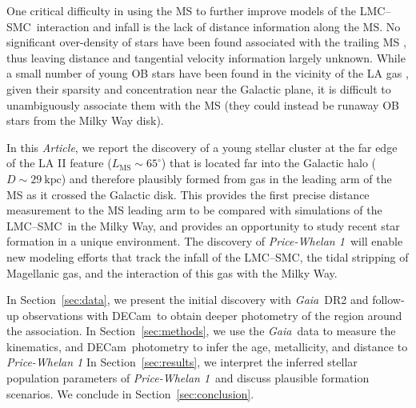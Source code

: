 \documentclass[twocolumn]{aastex62}
\newcommand{\acronym}[1]{{\small{#1}}}
\newcommand{\gaia}{\textsl{Gaia}}
\newcommand{\decam}{DECam}
\newcommand{\DR}[1]{\acronym{DR#1}}
\newcommand{\articlename}{\textsl{Article}}
\newcommand{\sectionname}{Section}
\newcommand{\clustername}{\textsl{Price-Whelan 1}}
\newcommand{\lmcsmc}{LMC--SMC}
\newcommand{\cldist}{\ensuremath{29~\textrm{kpc}}}
\begin{document}
One critical difficulty in using the MS to further improve models of the \lmcsmc\ interaction and infall is the lack of distance information along the MS.
No significant over-density of stars have been found associated with the trailing MS \citep{Guhathakurta:1998}, thus leaving distance and tangential velocity information largely unknown.
While a small number of young OB stars have been found in the vicinity of the LA gas \citep{Casetti-Dinescu:2014, Zhang:2017}, given their sparsity and concentration near the Galactic plane, it is difficult to unambiguously associate them with the MS (they could instead be runaway OB stars from the Milky Way disk).

In this \articlename, we report the discovery of a young stellar cluster at the far edge of the LA II feature ($L_{\textrm{MS}} \sim 65^\circ$) that is located far into the Galactic halo ($D \sim \cldist$) and therefore plausibly formed from gas in the leading arm of the MS as it crossed the Galactic disk.
This provides the first precise distance measurement to the MS leading arm to be compared with simulations of the \lmcsmc\ in the Milky Way, and provides an opportunity to study recent star formation in a unique environment.
The discovery of \clustername\ will enable new modeling efforts that track the infall of the \lmcsmc, the tidal stripping of Magellanic gas, and the interaction of this gas with the Milky Way.

In \sectionname~\ref{sec:data}, we present the initial discovery with \gaia\ \DR{2} and follow-up observations with \decam\ to obtain deeper photometry of the region around the association.
In \sectionname~\ref{sec:methods}, we use the \gaia\ data to measure the kinematics, and \decam\ photometry to infer the age, metallicity, and distance to \clustername
In \sectionname~\ref{sec:results}, we interpret the inferred stellar population parameters of \clustername\ and discuss plausible formation scenarios.
We conclude in \sectionname~\ref{sec:conclusion}.
\end{document}
